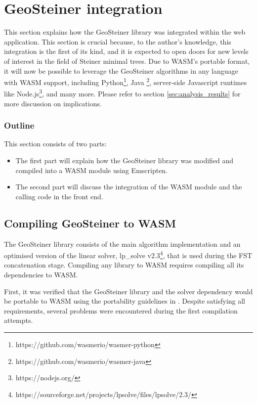 \documentclass{l4proj}
\begin{document}
\section{GeoSteiner integration}
\label{sec:geosteiner_integration}
This section explains how the GeoSteiner library was integrated within the web application. This section is crucial because, to the author's knowledge, this integration is the first of its kind, and it is expected to open doors for new levels of interest in the field of Steiner minimal trees. Due to WASM's portable format, it will now be possible to leverage the GeoSteiner algorithms in any language with WASM support, including Python\footnote{https://github.com/wasmerio/wasmer-python}, Java \footnote{https://github.com/wasmerio/wasmer-java}, server-side Javascript runtimes like Node.js\footnote{https://nodejs.org/}, and many more. Please refer to section \ref{sec:analysis_results} for more discussion on implications.

\subsubsection{Outline}
This section consists of two parts:
\begin{itemize}
    \item The first part will explain how the GeoSteiner library was modified and compiled into a WASM module using Emscripten.
    \item The second part will discuss the integration of the WASM module and the calling code in the front end.
\end{itemize}

\subsection{Compiling GeoSteiner to WASM}

The GeoSteiner library consists of the main algorithm implementation and an optimised version of the linear solver, lp\_solve v2.3\footnote{https://sourceforge.net/projects/lpsolve/files/lpsolve/2.3/}, that is used during the FST concatenation stage.
Compiling any library to WASM requires compiling all its dependencies to WASM.

First, it was verified that the GeoSteiner library and the solver dependency would be portable to WASM using the portability guidelines in \cite{Emscripten_portability}.
Despite satisfying all requirements, several problems were encountered during the first compilation attempts.
\end{document}
